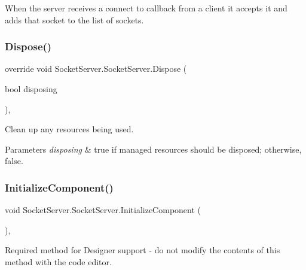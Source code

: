 When the server receives a connect to callback from a client it accepts it and adds that socket to the list of sockets. \mbox{\label{class_socket_server_1_1_socket_server_a577f703fecf496140d420e0049159905}} 
\subsubsection{\texorpdfstring{Dispose()}{Dispose()}}
{\footnotesize\ttfamily override void Socket\+Server.\+Socket\+Server.\+Dispose (\begin{DoxyParamCaption}\item[{bool}]{disposing }\end{DoxyParamCaption})\hspace{0.3cm}{\ttfamily [inline]}, {\ttfamily [protected]}}



Clean up any resources being used. 


\begin{DoxyParams}{Parameters}
{\em disposing} & true if managed resources should be disposed; otherwise, false.\\
\hline
\end{DoxyParams}
\mbox{\label{class_socket_server_1_1_socket_server_a19cb5f0314ec00e0837a893f079bf78d}} 
\subsubsection{\texorpdfstring{Initialize\+Component()}{InitializeComponent()}}
{\footnotesize\ttfamily void Socket\+Server.\+Socket\+Server.\+Initialize\+Component (\begin{DoxyParamCaption}{ }\end{DoxyParamCaption})\hspace{0.3cm}{\ttfamily [inline]}, {\ttfamily [private]}}



Required method for Designer support -\/ do not modify the contents of this method with the code editor. 

